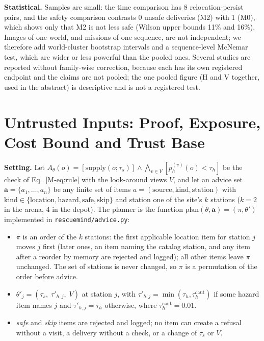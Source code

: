 \documentclass[conference]{IEEEtran}
\newcommand{\taus}{\tau_{s}}
\newcommand{\tauh}{\tau_{h}}
\begin{document}
\textbf{Statistical.} Samples are small: the time comparison has 8 relocation-persist pairs, and the safety comparison contrasts 0 unsafe deliveries (M2) with 1 (M0), which shows only that M2 is not less safe (Wilson upper bounds 11\% and 16\%).
Images of one world, and missions of one sequence, are not independent; we therefore add world-cluster bootstrap intervals and a
sequence-level McNemar test, which are wider or less powerful than the pooled ones. Several studies are reported without family-wise correction,
because each has its own registered endpoint and the claims are not pooled; the one pooled figure (H and V together, used in the abstract) is descriptive and is not a registered test.

\section{Untrusted Inputs: Proof, Exposure, Cost Bound and Trust Base}\label{app:advice}
\textbf{Setting.} Let $A_\theta(o)=[\text{supply}(o;\taus)]\wedge\bigwedge_{v\in V}[p_h^{(v)}(o)<\tauh]$ be the check of Eq.~\eqref{M-eq:rule} with the
look-around views $V$, and let an advice set $\mathbf{a}=\{a_1,\dots,a_n\}$ be any finite set of items $a=(\text{source},\text{kind},\text{station})$ with
$\text{kind}\in\{\text{location},\text{hazard},\text{safe},\text{skip}\}$ and station one of the site's $k$ stations ($k=2$ in the arena, 4 in the depot). The planner is the function
$\mathrm{plan}(\theta,\mathbf{a})=(\pi,\theta')$ implemented in \texttt{rescuemind/advice.py}:
\begin{itemize}
\item $\pi$ is an order of the $k$ stations: the first applicable location item for station $j$ moves $j$ first (later ones, an item naming the catalog station, and any item after a reorder by memory are rejected and logged); all other items leave $\pi$ unchanged. The set of stations is never changed, so $\pi$ is a permutation of the order before advice.
\item $\theta'_j=(\taus,\;\tau'_{h,j},\;V)$ at station $j$, with $\tau'_{h,j}=\min(\tauh,\tau_h^{\mathrm{caut}})$ if some hazard item names $j$ and $\tau'_{h,j}=\tauh$ otherwise, where $\tau_h^{\mathrm{caut}}=0.01$.
\item \emph{safe} and \emph{skip} items are rejected and logged; no item can create a refusal without a visit, a delivery without a check, or a change of $\taus$ or $V$.
\end{itemize}
\end{document}

